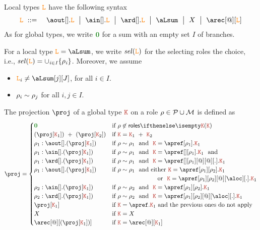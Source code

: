 Local types $\texttt{\textcolor{orange}L}$ have the following syntax
\begin{eqnarray*}
  \aL & \bnfdef & %
                  \aout[].\aL \bnfmid
                  \ain[].\aL \bnfmid
                  \ard[].\aL \bnfmid
                  \aLsum \bnfmid
                  X \bnfmid
                  \arec[@][\aL]
\end{eqnarray*}
As for global types, we write $\nil$ for a sum with an empty set $I$ of branches. 

For a local type $\aL = \aLsum$, we write $\it{sel}(\texttt{\textcolor{orange}L})$ for the selecting roles the choice, i.e.,
$\it{sel}(\texttt{\textcolor{orange}L}) = \cup_{i\in I}{\{\rho_i\}}$.
%
Moreover, we assume
\begin{itemize}
\item $\aL_i \neq\aLsum[j][J]$, for all $i \in I$.
\item $\rho_i \sim \rho_j$ for all $i,j \in I$.
\end{itemize}

The projection $\proj$ of a global type $\aK$ on a role
$\rho \in \mathcal{P} \cup \mathcal{M}$ is defined as
\[
  \proj =
  \begin{cases}
    \nil & \text{if } \arole \not \in \roles \aK
    \\
    (\proj[\aK_1]) \ + \ (\proj[\aK_2])
    &
    \text{if } \aK = \aK_1 \ + \ \aK_2
    \\
    \arole_1 : \aout[].(\proj[\aK_1])
    &
    \text{if } \arole \eqR \arole_1\ \text{ and }\ \aK = \apref[\arole_1].\aK_1
    \\
    \arole_1 : \ain[].(\proj[\aK_1])
    &
    \text{if } \arole \eqR \arole_1\ \text{ and }\ \aK = \apref[{}][\arole_1].\aK_1 \ \text{ and }
    \\
    \arole_1 : \ard[].(\proj[\aK_1])
    &
    \text{if } \arole \eqR \arole_1\ \text{ and }\ \aK = \apref[{}][\arole_1][@][@][.].\aK_1
    \\
    \arole_1 : \aout[].(\proj[\aK_1])
    &
    \text{if } \arole \eqR \arole_1\ \text{ and either}\ \aK = \apref[\arole_1][\arole_2].\aK_1
    \\
    &
    \hspace{2.5cm}\text{ or }\ \aK = \apref[\arole_1][\arole_2][@][\aloc][.].\aK_1
    \\
    \arole_2 : \ain[].(\proj[\aK_1])
    &
    \text{if } \arole \eqR \arole_2\ \text{ and }\ \aK = \apref[\arole_1][\arole_2].\aK_1
    \\
    \arole_2 : \ard[].(\proj[\aK_1])
    &
    \text{if } \arole \eqR \arole_2\ \text{ and }\ \aK = \apref[\arole_1][\arole_2][@][\aloc][.].\aK_1
    \\
    \proj[\aK_1]
    &
    \text{if } \aK = \apref.\aK_1 \text{ and the previous ones do not apply}
   \\
   X
   & \text{if } \aK = X
   \\
   \arec[@][{(\proj[\aK_1])}]
   &
   \text{if } \aK = \arec[@][\aK_1]
  \end{cases}
\]


